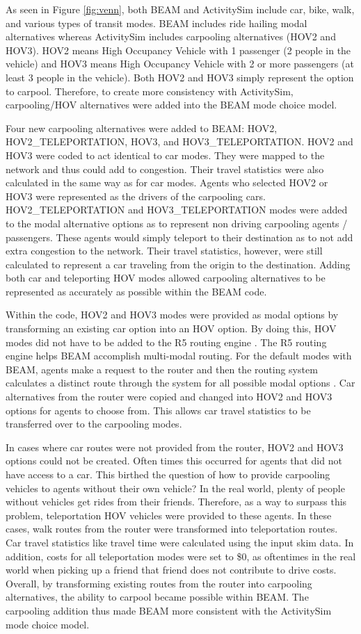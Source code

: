 \documentclass[3p, authoryear, review]{elsarticle} %
\begin{document}
As seen in Figure \ref{fig:venn}, both BEAM and ActivitySim include car, bike, walk, and various types of transit modes. BEAM includes ride hailing modal alternatives whereas ActivitySim includes carpooling alternatives (HOV2 and HOV3). HOV2 means High Occupancy Vehicle with 1 passenger (2 people in the vehicle) and HOV3 means High Occupancy Vehicle with 2 or more passengers (at least 3 people in the vehicle). Both HOV2 and HOV3 simply represent the option to carpool. Therefore, to create more consistency with ActivitySim, carpooling/HOV alternatives were added into the BEAM mode choice model.

Four new carpooling alternatives were added to BEAM: HOV2, HOV2\_TELEPORTATION, HOV3, and HOV3\_TELEPORTATION. HOV2 and HOV3 were coded to act identical to car modes. They were mapped to the network and thus could add to congestion. Their travel statistics were also calculated in the same way as for car modes. Agents who selected HOV2 or HOV3 were represented as the drivers of the carpooling cars. HOV2\_TELEPORTATION and HOV3\_TELEPORTATION modes were added to the modal alternative options as to represent non driving carpooling agents / passengers. These agents would simply teleport to their destination as to not add extra congestion to the network. Their travel statistics, however, were still calculated to represent a car traveling from the origin to the destination. Adding both car and teleporting HOV modes allowed carpooling alternatives to be represented as accurately as possible within the BEAM code.

Within the code, HOV2 and HOV3 modes were provided as modal options by transforming an existing car option into an HOV option. By doing this, HOV modes did not have to be added to the R5 routing engine \citep{r5}. The R5 routing engine helps BEAM accomplish multi-modal routing. For the default modes with BEAM, agents make a request to the router and then the routing system calculates a distinct route through the system for all possible modal options \citep{beam}. Car alternatives from the router were copied and changed into HOV2 and HOV3 options for agents to choose from. This allows car travel statistics to be transferred over to the carpooling modes.

In cases where car routes were not provided from the router, HOV2 and HOV3 options could not be created. Often times this occurred for agents that did not have access to a car. This birthed the question of how to provide carpooling vehicles to agents without their own vehicle? In the real world, plenty of people without vehicles get rides from their friends. Therefore, as a way to surpass this problem, teleportation HOV vehicles were provided to these agents. In these cases, walk routes from the router were transformed into teleportation routes. Car travel statistics like travel time were calculated using the input skim data. In addition, costs for all teleportation modes were set to \$0, as oftentimes in the real world when picking up a friend that friend does not contribute to drive costs. Overall, by transforming existing routes from the router into carpooling alternatives, the ability to carpool became possible within BEAM. The carpooling addition thus made BEAM more consistent with the ActivitySim mode choice model.
\end{document}
